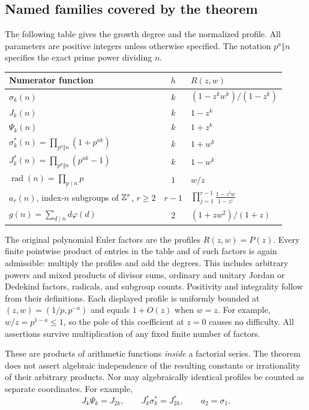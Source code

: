 \subsection{Named families covered by the theorem}

The following table gives the growth degree and the normalized
profile.  All parameters are positive integers unless otherwise
specified.  The notation $p^a\Vert n$ specifies the exact prime
power dividing $n$.
\begin{center}
\small
\begin{tabular}{p{}c p{}}
\toprule
Numerator function & $h$ & $R(z,w)$\\
\midrule
$\sigma_k(n)$ & $k$ & $(1-z^kw^k)/(1-z^k)$\\[5pt]
$J_k(n)$ & $k$ & $1-z^k$\\[5pt]
$\Psi_k(n)$ & $k$ & $1+z^k$\\[5pt]
$\sigma_k^*(n)=\prod_{p^a\Vert n}(1+p^{ak})$ & $k$ & $1+w^k$\\[5pt]
$J_k^*(n)=\prod_{p^a\Vert n}(p^{ak}-1)$ & $k$ & $1-w^k$\\[5pt]
$\operatorname{rad}(n)=\prod_{p\mid n}p$ & $1$ & $w/z$\\[5pt]
$a_r(n)$, index-$n$ subgroups of $\mathbb Z^r$, $r\geq2$
 & $r-1$ & $\displaystyle\prod_{j=1}^{r-1}\frac{1-z^jw}{1-z^j}$\\[9pt]
$g(n)=\sum_{d\mid n}d\varphi(d)$ & $2$ & $(1+zw^2)/(1+z)$\\
\bottomrule
\end{tabular}
\end{center}

The original polynomial Euler factors are the profiles $R(z,w)=P(z)$.
Every finite pointwise product of entries in the table and of such
factors is again admissible: multiply the profiles and add the
degrees.  This includes arbitrary powers and mixed products of
divisor sums, ordinary and unitary Jordan or Dedekind factors,
radicals, and subgroup counts.  Positivity and integrality follow
from their definitions.  Each displayed profile is uniformly
bounded at $(z,w)=(1/p,p^{-a})$ and equals $1+O(z)$ when $w=z$.
For example, $w/z=p^{1-a}\leq1$, so the pole of this coefficient
at $z=0$ causes no difficulty.  All assertions survive multiplication
of any fixed finite number of factors.

These are products of arithmetic functions \emph{inside} a factorial
series.  The theorem does not assert algebraic independence of the
resulting constants or irrationality of their arbitrary products.
Nor may algebraically identical profiles be counted as separate
coordinates.  For example,
\[
 J_k\Psi_k=J_{2k},\qquad J_k^*\sigma_k^*=J_{2k}^*,
 \qquad a_2=\sigma_1.
\]

